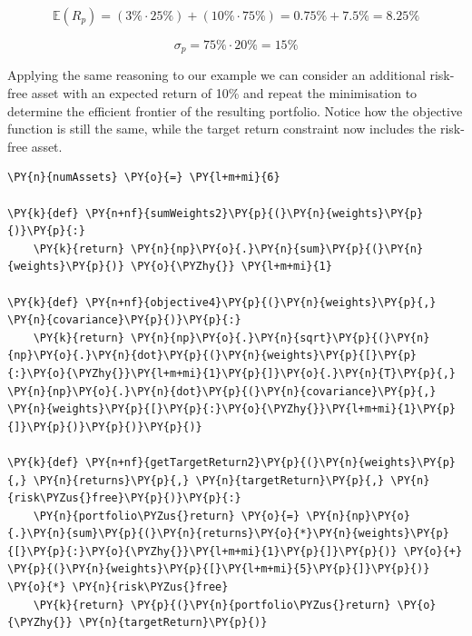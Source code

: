 \[ \mathbb{E}(R_p) = (3\% \cdot 25\%) + (10\% \cdot 75\%) = 0.75\% + 7.5\% = 8.25\% \]

\[ \sigma_p = 75\% \cdot 20\% = 15\% \]

Applying the same reasoning to our example we can consider an additional
risk-free asset with an expected return of 10\% and repeat the
minimisation to determine the efficient frontier of the resulting
portfolio. Notice how the objective function is still the same, while
the target return constraint now includes the risk-free asset.

\begin{tcolorbox}[breakable, size=fbox, boxrule=1pt, pad at break*=1mm,colback=cellbackground, colframe=cellborder]
\begin{Verbatim}[commandchars=\\\{\}]
\PY{n}{numAssets} \PY{o}{=} \PY{l+m+mi}{6}

\PY{k}{def} \PY{n+nf}{sumWeights2}\PY{p}{(}\PY{n}{weights}\PY{p}{)}\PY{p}{:}
    \PY{k}{return} \PY{n}{np}\PY{o}{.}\PY{n}{sum}\PY{p}{(}\PY{n}{weights}\PY{p}{)} \PY{o}{\PYZhy{}} \PY{l+m+mi}{1}

\PY{k}{def} \PY{n+nf}{objective4}\PY{p}{(}\PY{n}{weights}\PY{p}{,} \PY{n}{covariance}\PY{p}{)}\PY{p}{:}
    \PY{k}{return} \PY{n}{np}\PY{o}{.}\PY{n}{sqrt}\PY{p}{(}\PY{n}{np}\PY{o}{.}\PY{n}{dot}\PY{p}{(}\PY{n}{weights}\PY{p}{[}\PY{p}{:}\PY{o}{\PYZhy{}}\PY{l+m+mi}{1}\PY{p}{]}\PY{o}{.}\PY{n}{T}\PY{p}{,} \PY{n}{np}\PY{o}{.}\PY{n}{dot}\PY{p}{(}\PY{n}{covariance}\PY{p}{,} \PY{n}{weights}\PY{p}{[}\PY{p}{:}\PY{o}{\PYZhy{}}\PY{l+m+mi}{1}\PY{p}{]}\PY{p}{)}\PY{p}{)}\PY{p}{)}

\PY{k}{def} \PY{n+nf}{getTargetReturn2}\PY{p}{(}\PY{n}{weights}\PY{p}{,} \PY{n}{returns}\PY{p}{,} \PY{n}{targetReturn}\PY{p}{,} \PY{n}{risk\PYZus{}free}\PY{p}{)}\PY{p}{:}
    \PY{n}{portfolio\PYZus{}return} \PY{o}{=} \PY{n}{np}\PY{o}{.}\PY{n}{sum}\PY{p}{(}\PY{n}{returns}\PY{o}{*}\PY{n}{weights}\PY{p}{[}\PY{p}{:}\PY{o}{\PYZhy{}}\PY{l+m+mi}{1}\PY{p}{]}\PY{p}{)} \PY{o}{+} \PY{p}{(}\PY{n}{weights}\PY{p}{[}\PY{l+m+mi}{5}\PY{p}{]}\PY{p}{)} \PY{o}{*} \PY{n}{risk\PYZus{}free}
    \PY{k}{return} \PY{p}{(}\PY{n}{portfolio\PYZus{}return} \PY{o}{\PYZhy{}} \PY{n}{targetReturn}\PY{p}{)}


\end{Verbatim}
\end{tcolorbox}
